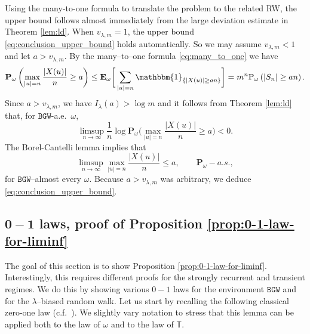 \documentclass[11 pt]{article}
\theoremstyle{definition}
\numberwithin{equation}{section}
\newcommand{\TT}{\mathbb{T}} %
\newcommand{\ind}[1]{\mathbbm{1}_{\left\{ #1 \right\} } } %
\newcommand{\Pw}{\mathbf{P}_{\omega}} %
\newcommand{\Ew}{\mathbf{E}_{\omega}} %
\newcommand{\Pws}{\mathrm{P}_{\omega}} %
\begin{document}
Using the many-to-one formula to translate the problem to the related RW, the upper bound follows almost immediately from the large deviation estimate in Theorem \ref{lem:ld}.
When $ v_{\lambda,m}=1$, the upper bound \eqref{eq:conclusion_upper_bound} holds automatically. So we may assume $ v_{\lambda,m}<1$ and let $a>v_{\lambda,m}$. By the many--to--one formula \eqref{eq:many_to_one} we have 
\begin{equation*}
	\Pw\left( \max_{|u|=n} \frac{\vert X(u) \vert }{n}\ge  a \right) \le  \Ew \bigg[\sum_{|u|=n} \ind{|X(u)|\ge a n} \bigg] =  m^n \Pws\left( |S_n|\ge a n \right).    
\end{equation*}
Since $a>v_{\lambda, m}$, we have $I_{\lambda}(a)>\log m$ and it follows from Theorem \ref{lem:ld} that, for $\mathtt{BGW}$-a.e.\ $\omega$, 
\[
\limsup_{n\to \infty} \frac{1}{n} \log \Pw\bigg( \max_{|u|=n} \frac{\vert X(u) \vert }{n}\ge  a \bigg) < 0.
\]
The Borel-Cantelli lemma implies that
\begin{equation*}
	\limsup_{n \to \infty} \max_{|u|=n} \frac{\vert X(u) \vert }{n} \leq  a, \qquad \Pw-a.s.,
\end{equation*}
for $\mathtt{BGW}$--almost every $\omega$. Because $a>v_{\lambda,m}$ was arbitrary, we deduce \eqref{eq:conclusion_upper_bound}. 



\subsection{$\mathbf{0-1}$ laws, proof of Proposition \ref{prop:0-1-law-for-liminf}}\label{sec:0_1_laws}

The goal of this section is to show Proposition \ref{prop:0-1-law-for-liminf}. Interestingly, this requires different proofs for the strongly recurrent and transient regimes. We do this by showing various $0-1$ laws for the environment $\mathtt{BGW}$ and for the $\lambda$--biased random walk. Let us start by recalling the following classical zero-one law (c.f.~\cite[Proposition 5.6]{lyons_probability_2016}). We slightly vary notation to stress that this lemma can be applied both to the law of $\omega$ and to the law of $\TT$. 
 
\end{document}
